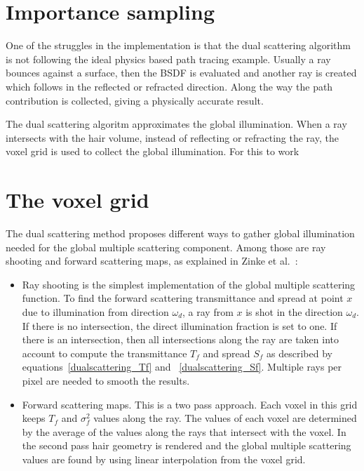 \documentclass[11pt,a4paper]{report}
\begin{document}
\section{Importance sampling}

One of the struggles in the implementation is that the dual scattering algorithm is not following the ideal physics based path tracing example. Usually a ray bounces against a surface, then the BSDF is evaluated and another ray is created which follows in the reflected or refracted direction. Along the way the path contribution is collected, giving a physically accurate result.

The dual scattering algoritm approximates the global illumination. When a ray intersects with the hair volume, instead of reflecting or refracting the ray, the voxel grid is used to collect the global illumination. For this to work




\section{The voxel grid}

The dual scattering method proposes different ways to gather global illumination needed for the global multiple scattering component. Among those are ray shooting and forward scattering maps, as explained in Zinke et al.~\cite{zinke}:

\begin{itemize}
\item Ray shooting is the simplest implementation of the global multiple scattering function. To find the forward scattering transmittance and spread at point $x$ due to illumination from direction $\omega_d$, a ray from $x$ is shot in the direction $\omega_d$. If there is no intersection, the direct illumination fraction is set to one. If there is an intersection, then all intersections along the ray are taken into account to compute the transmittance $T_f$ and spread $S_f$ as described by equations~\ref{dualscattering_Tf} and ~\ref{dualscattering_Sf}. Multiple rays per pixel are needed to smooth the results.

\item Forward scattering maps. This is a two pass approach. Each voxel in this grid keeps $T_f$ and $\sigma_f^2$ values along the ray. The values of each voxel are determined by the average of the values along the rays that intersect with the voxel. In the second pass hair geometry is rendered and the global multiple scattering values are found by using linear interpolation from the voxel grid.
\end{itemize}
\end{document}
